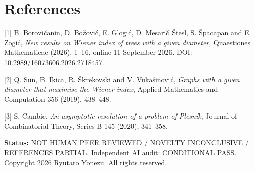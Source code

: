 \documentclass[
  11pt,
]{article}
\begin{document}
\section{References}\label{references}

{[}1{]} B. Borovićanin, D. Božović, E. Glogić, D. Mesarič Štesl, S.
Špacapan and E. Zogić, \emph{New results on Wiener index of trees with a
given diameter}, Quaestiones Mathematicae (2026), 1--16, online 11
September 2026. DOI: 10.2989/16073606.2026.2718457.

{[}2{]} Q. Sun, B. Ikica, R. Škrekovski and V. Vukašinović, \emph{Graphs
with a given diameter that maximise the Wiener index}, Applied
Mathematics and Computation 356 (2019), 438--448.

{[}3{]} S. Cambie, \emph{An asymptotic resolution of a problem of
Plesník}, Journal of Combinatorial Theory, Series B 145 (2020),
341--358.

\textbf{Status:} NOT HUMAN PEER REVIEWED / NOVELTY INCONCLUSIVE /
REFERENCES PARTIAL. Independent AI audit: CONDITIONAL PASS. Copyright
2026 Ryutaro Yonezu. All rights reserved.
\end{document}
